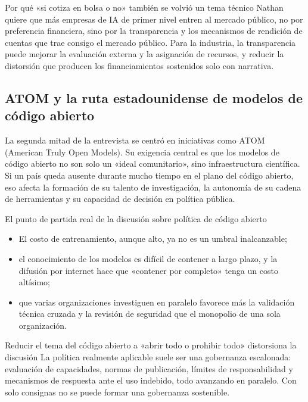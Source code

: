 \documentclass[a4paper]{article}
\begin{document}
\begin{knowledgebox}{Por qué «si cotiza en bolsa o no» también se volvió un tema técnico}
Nathan quiere que más empresas de IA de primer nivel entren al mercado público, no por preferencia financiera, sino por la transparencia y los mecanismos de rendición de cuentas que trae consigo el mercado público. Para la industria, la transparencia puede mejorar la evaluación externa y la asignación de recursos, y reducir la distorsión que producen los financiamientos sostenidos solo con narrativa.
\end{knowledgebox}

\subsection{ATOM y la ruta estadounidense de modelos de código abierto}

La segunda mitad de la entrevista se centró en iniciativas como ATOM (American Truly Open Models). Su exigencia central es que los modelos de código abierto no son solo un «ideal comunitario», sino infraestructura científica. Si un país queda ausente durante mucho tiempo en el plano del código abierto, eso afecta la formación de su talento de investigación, la autonomía de su cadena de herramientas y su capacidad de decisión en política pública.

\begin{importantbox}{El punto de partida real de la discusión sobre política de código abierto}
\begin{itemize}[leftmargin=1.5em]
    \item El costo de entrenamiento, aunque alto, ya no es un umbral inalcanzable;
    \item el conocimiento de los modelos es difícil de contener a largo plazo, y la difusión por internet hace que «contener por completo» tenga un costo altísimo;
    \item que varias organizaciones investiguen en paralelo favorece más la validación técnica cruzada y la revisión de seguridad que el monopolio de una sola organización.
\end{itemize}
\end{importantbox}

\begin{warningbox}{Reducir el tema del código abierto a «abrir todo o prohibir todo» distorsiona la discusión}
La política realmente aplicable suele ser una gobernanza escalonada: evaluación de capacidades, normas de publicación, límites de responsabilidad y mecanismos de respuesta ante el uso indebido, todo avanzando en paralelo. Con solo consignas no se puede formar una gobernanza sostenible.
\end{warningbox}
\end{document}
